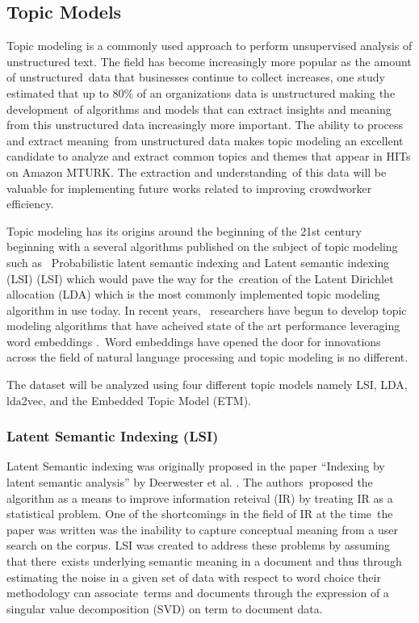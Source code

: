 \documentclass[letterpaper,12pt]{article}
\begin{document}
\subsection{Topic Models}
Topic modeling is a commonly used approach to perform unsupervised analysis of unstructured text. The field has become increasingly more popular as the amount of unstructured\
data that businesses continue to collect increases, one study estimated that up to 80\% of an organizations data is unstructured \cite{Sint2009CombiningUF} making the development\
of algorithms and models that can extract insights and meaning from this unstructured data increasingly more important. The ability to process and extract meaning\
from unstructured data makes topic modeling an excellent candidate to analyze and extract common topics and themes that appear in HITs on Amazon MTURK. The extraction and understanding\
of this data will be valuable for implementing future works related to improving crowdworker efficiency.

Topic modeling has its origins around the beginning of the 21st century beginning with a several algorithms published on the subject of topic modeling such as \
Probabilistic latent semantic indexing \cite{hofmann1999probabilistic} and Latent semantic indexing (LSI)\cite{papadimitriou2000latent} (LSI) which would pave the way for the\
creation of the Latent Dirichlet allocation (LDA) \cite{blei2003latent} which is the most commonly implemented topic modeling algorithm in use today. In recent years, \
researchers have begun to develop topic modeling algorithms that have acheived state of the art performance leveraging word embeddings \cite{mikolov2013distributed} \cite{dieng2019topic}.\
Word embeddings have opened the door for innovations across the field of natural language processing and topic modeling is no different. 

The dataset will be analyzed using four different topic models namely LSI, LDA, lda2vec, and the Embedded Topic Model (ETM). 
\subsubsection{Latent Semantic Indexing (LSI)}
Latent Semantic indexing was originally proposed in the paper ``Indexing by latent semantic analysis'' by Deerwester et al. \cite{deerwester1990indexing}. The authors\
proposed the algorithm as a means to improve information reteival (IR) by treating IR as a statistical problem. One of the shortcomings in the field of IR at the time\
the paper was written was the inability to capture conceptual meaning from a user search on the corpus. LSI was created to address these problems by assuming that there\
exists underlying semantic meaning in a document and thus through estimating the noise in a given set of data with respect to word choice their methodology can associate\
terms and documents through the expression of a singular value decomposition (SVD) on term to document data.
\end{document}
